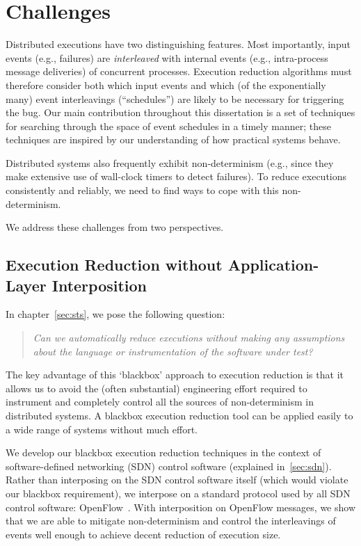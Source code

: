 
\section{Challenges}

Distributed executions have two distinguishing features. Most importantly, input events
(e.g., failures)
are {\em interleaved} with internal events (e.g., intra-process
message deliveries) of concurrent processes. Execution reduction algorithms must therefore consider both which
input events and which (of the exponentially many)
event interleavings (``schedules'') are likely to be necessary for triggering the bug. Our main contribution
throughout this dissertation is a set of techniques for searching
through the space of event schedules in a timely manner; these techniques are inspired
by our understanding of how practical systems behave.

Distributed systems also frequently exhibit non-determinism (e.g., since they
make extensive use of wall-clock timers to detect failures). To reduce executions
consistently and reliably, we need to find ways to cope with this non-determinism.

We address these challenges from two perspectives.

\subsection{Execution Reduction without Application-Layer Interposition}

In chapter~\ref{sec:sts}, we pose
the following question:

\begin{quote}
\textit{Can we automatically reduce
executions without making any assumptions about the language or
instrumentation of the software under test?}
\end{quote}

The key advantage of this `blackbox' approach to execution reduction is that
it allows us to avoid the (often substantial) engineering effort required to
instrument and completely control all the sources of non-determinism in
distributed
systems. A blackbox execution reduction tool can be applied easily to a wide
range of systems without much effort.

We develop our blackbox execution reduction techniques
in the context of software-defined
networking (SDN) control software (explained in~\ref{sec:sdn}). Rather than interposing on the SDN control
software itself
(which would violate our blackbox requirement), we interpose on a standard
protocol used by all SDN control software: OpenFlow~\cite{openflow}. With
interposition on OpenFlow messages, we show that we are able to mitigate
non-determinism and control the
interleavings of events well enough to achieve decent reduction of execution
size.

